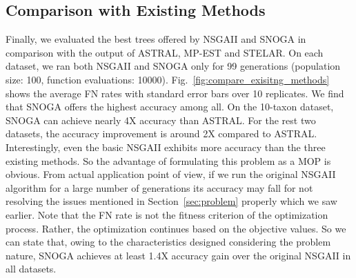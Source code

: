 \subsection{Comparison with Existing Methods}
Finally, we evaluated the best trees offered by NSGAII and SNOGA in comparison with the output of ASTRAL, MP-EST and STELAR. On each dataset, we ran both NSGAII and SNOGA only for 99 generations (population size: 100, function evaluations: 10000). 
Fig.~\ref{fig:compare_exisitng_methods} shows the average FN rates with standard error bars over 10 replicates. We find that SNOGA offers the highest accuracy among all. On the 10-taxon dataset, SNOGA can achieve nearly 4X accuracy than ASTRAL. For the rest two datasets, the accuracy improvement is around 2X compared to ASTRAL. Interestingly, even the basic NSGAII exhibits more accuracy than the three existing methods. So the advantage of formulating this problem as a MOP is obvious. From actual application point of view, if we run the original NSGAII algorithm for a large number of generations its accuracy may fall for not resolving the issues mentioned in Section~\ref{sec:problem} properly which we saw earlier. Note that the FN rate is not the fitness criterion of the optimization process. Rather, the optimization continues based on the objective values.
So we can state that, owing to the characteristics designed considering the problem nature, SNOGA achieves at least 1.4X accuracy gain over the original NSGAII in all datasets. 





